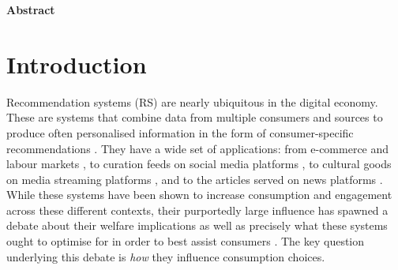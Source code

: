 \documentclass[12pt]{article}
\theoremstyle{newtheorem}
\begin{document}
\setcounter{footnote}{0} \renewcommand{\thefootnote}{\arabic{footnote}}


\begin{center} \textbf{\large Abstract} \end{center}
\vspace*{1em}
\noindent{}
\newpage




\setcounter{page}{1}


\section{Introduction}
\label{section:introduction}
Recommendation systems (RS) are nearly ubiquitous in the digital economy.
These are systems that combine data from multiple consumers and sources to produce often personalised information in the form of consumer-specific recommendations \citep{ResnickVarian1997ACM}.
They have a wide set of applications: from e-commerce \citep{DinersteinEinavLevinSundaresan2018AER} and labour markets \citep{Horton2017JLE}, to curation feeds on social media platforms \citep{Levy2021AER}, to cultural goods on media streaming platforms \citep{HoltzCarteretteChandarNazariCramerAral2020WP}, and to the articles served on news platforms \citep{ChiouTucker2017JEMS,ClaussenPeukertSen2023MS}.
While these systems have been shown to increase consumption and engagement across these different contexts, their purportedly large influence has spawned a debate about their welfare implications as well as precisely what these systems ought to optimise for in order to best assist consumers \citep{McNeeRiedlKonstan2006, KleinbergMullainathanRaghavan2023MS}. 
The key question underlying this debate is \emph{how} they influence consumption choices.
\end{document}

